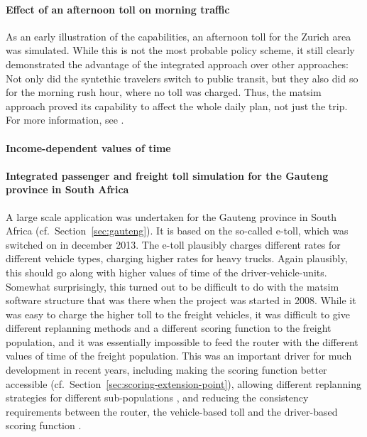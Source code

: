\paragraph{Effect of an afternoon toll on morning traffic}

As an early illustration of the capabilities, an afternoon toll for the Zurich area was simulated.  While this is not the most probable policy scheme, it still clearly demonstrated the advantage of the integrated approach over other approaches: Not only did the syntethic travelers switch to public transit, but they also did so for the morning rush hour, where no toll was charged.  Thus, the \acrshort{matsim} approach proved its capability to affect the whole daily plan, not just the trip.  For more information, see \cite{RieserEtAl_TRBTDF_2008}.


\paragraph{Income-dependent values of time}


\paragraph{Integrated passenger and freight toll simulation for the Gauteng province in South Africa}

A large scale application was undertaken for the Gauteng province in South Africa (cf.\ Section~\ref{sec:gauteng}).  It is based on the so-called e-toll, which was switched on in december 2013.  The e-toll plausibly charges different rates for different vehicle types, charging higher rates for heavy trucks.  Again plausibly, this should go along with higher values of time of the driver-vehicle-units.  Somewhat surprisingly, this turned out to be difficult to do with the \acrshort{matsim} software structure that was there when the project was started in 2008.  While it was easy to charge the higher toll to the freight vehicles, it was difficult to give different replanning methods and a different scoring function to the freight population, and it was essentially impossible to feed the router with the different values of time of the freight population.  This was an important driver for much development in recent years, including making the scoring function better accessible (cf.\ Section~\ref{sec:scoring-extension-point}), allowing different replanning strategies for different sub-populations , and reducing the consistency requirements between the router, the vehicle-based toll and the driver-based scoring function \citep{NagelEtAl_PCS_2014}.

